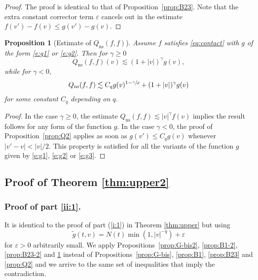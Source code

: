 \documentclass[11pt]{article}
\newcommand{\Subsection}{\subsection}
\newcommand{\ns}{\mathrm{ns}}
\theoremstyle{plain}
\newtheorem{prop}[thm]{Proposition}
\theoremstyle{definition}
\numberwithin{equation}{section}
\newcommand{\eps}{\varepsilon}
\let\A N
\begin{document}
\begin{proof}
The proof is identical to that of Proposition~\ref{prop:B23}. Note
that the extra constant corrector term $\eps$ cancels out in the estimate
$f(v') - f(v) \leq g(v') - g(v)$.
\end{proof}

\begin{prop}[Estimate of $Q_{\ns}(f,f)$] \label{prop:Q2-2} Assume $f$
satisfies \eqref{eq:contact} with $g$ of the form \eqref{e:g1} or
\eqref{e:g2}. Then for $\gamma \ge 0$
\[ Q_{\ns}(f,f)(v) \lesssim (1+|v|)^{\gamma} g(v), \]
while for $\gamma <0$,
\[
Q_{\ns}(f,f) \lesssim C_q g(v)^{1-\sfrac{\gamma}{d}} +
(1+|v|)^\gamma g(v)
\]
for some constant $C_q$ depending on $q$.
\end{prop}

\begin{proof}
In the case $\gamma \geq 0$, the estimate
$Q_{\ns}(f,f) \lesssim |v|^{\gamma} f(v)$ implies the result follows
for any form of the function $g$. In the case $\gamma < 0$, the
proof of Proposition~\ref{prop:Q2} applies as soon as
$g(v') \leq C_q g(v)$ whenever $|v'-v| < |v|/2$. This property is
satisfied for all the variants of the function $g$ given by
\eqref{e:g1}, \eqref{e:g2} or \eqref{e:g3}.
\end{proof}

\Subsection{Proof of Theorem \ref{thm:upper2}}

\subsubsection{Proof of part \eqref{ii:1}.} It is identical
to the proof of part (\ref{i:1}) in Theorem \ref{thm:upper} but using
\[\tilde g(t,v) = \A(t) \min(1,|v|^{-q}) + \eps\] for $\eps > 0$ arbitrarily
small. We apply Propositions~\ref{prop:G-bis2}, \ref{prop:B1-2},
\ref{prop:B23-2} and \ref{prop:Q2-2} instead of
Propositions~\ref{prop:G-bis}, \ref{prop:B1}, \ref{prop:B23} and
\ref{prop:Q2} and we arrive to the same set of inequalities that imply
the contradiction.
\end{document}

